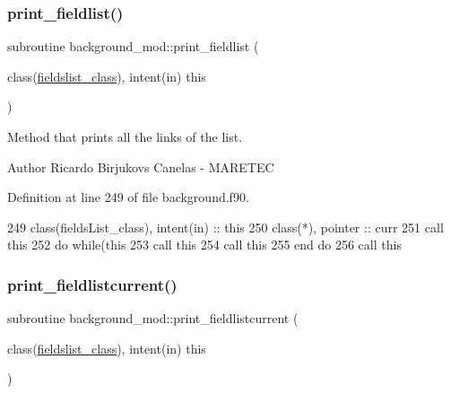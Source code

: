 \subsubsection{\texorpdfstring{print\+\_\+fieldlist()}{print\_fieldlist()}}
{\footnotesize\ttfamily subroutine background\+\_\+mod\+::print\+\_\+fieldlist (\begin{DoxyParamCaption}\item[{class(\mbox{\hyperlink{structbackground__mod_1_1fieldslist__class}{fieldslist\+\_\+class}}), intent(in)}]{this }\end{DoxyParamCaption})\hspace{0.3cm}{\ttfamily [private]}}



Method that prints all the links of the list. 

\begin{DoxyAuthor}{Author}
Ricardo Birjukovs Canelas -\/ M\+A\+R\+E\+T\+EC 
\end{DoxyAuthor}


Definition at line 249 of file background.\+f90.


\begin{DoxyCode}
249     \textcolor{keywordtype}{class}(fieldsList\_class), \textcolor{keywordtype}{intent(in)} :: this
250     \textcolor{keywordtype}{class}(*), \textcolor{keywordtype}{pointer} :: curr
251     \textcolor{keyword}{call }this%
252     \textcolor{keywordflow}{do} \textcolor{keywordflow}{while}(this%
253         \textcolor{keyword}{call }this%
254         \textcolor{keyword}{call }this%
255 \textcolor{keywordflow}{    end do}
256     \textcolor{keyword}{call }this%
\end{DoxyCode}
\mbox{\label{namespacebackground__mod_a2bd18f3830c0667741efd086d36753db}} 
\subsubsection{\texorpdfstring{print\+\_\+fieldlistcurrent()}{print\_fieldlistcurrent()}}
{\footnotesize\ttfamily subroutine background\+\_\+mod\+::print\+\_\+fieldlistcurrent (\begin{DoxyParamCaption}\item[{class(\mbox{\hyperlink{structbackground__mod_1_1fieldslist__class}{fieldslist\+\_\+class}}), intent(in)}]{this }\end{DoxyParamCaption})\hspace{0.3cm}{\ttfamily [private]}}



